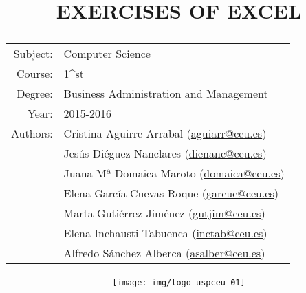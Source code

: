 \documentclass[a4paper,titlepage]{article}
\begin{document}
\sloppy

\title{\vskip 2cm
\Huge \textbf{\textsf{\quad \textcolor{blueceu}{EXERCISES OF EXCEL}\quad}}\\
   \vskip 1cm
\Large \sffamily
\begin{tabular}{rl}
\textcolor{blueceu}{Subject:} & Computer Science\\
\textcolor{blueceu}{Course:} & 1^{st}\\
\textcolor{blueceu}{Degree:} &  Business Administration and Management\\
\textcolor{blueceu}{Year:} & 2015-2016\\
\textcolor{blueceu}{Authors:} & Cristina Aguirre Arrabal (\url{aguiarr@ceu.es})\\
& Jesús Diéguez Nanclares (\url{dienanc@ceu.es})\\
& Juana Mª Domaica Maroto (\url{domaica@ceu.es})\\
& Elena García-Cuevas Roque (\url{garcue@ceu.es})\\
& Marta Gutiérrez Jiménez (\url{gutjim@ceu.es})\\
& Elena Inchausti Tabuenca  (\url{inctab@ceu.es})\\
& Alfredo Sánchez Alberca (\url{asalber@ceu.es})
\end{tabular}
}

\author{}
\date{\texttt{[image: img/logo\_uspceu\_01]}}

\maketitle
\newpage
\tableofcontents
\newpage






% 
% 
\end{document}
